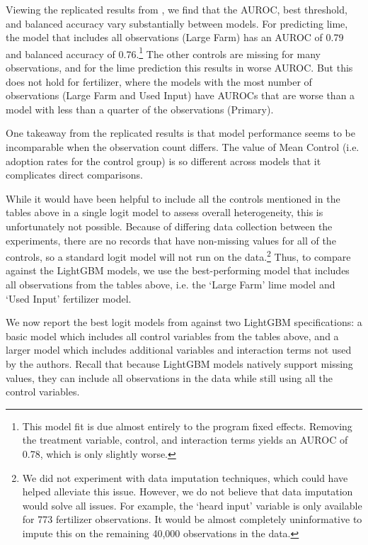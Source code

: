 \documentclass[12pt]{article}
\begin{document}



Viewing the replicated results from \textcite{fabregas_digital_2025}, we find that the AUROC, best threshold, and balanced accuracy vary substantially between models. For predicting lime, the model that includes all observations (Large Farm) has an AUROC of 0.79 and balanced accuracy of 0.76.\footnote{This model fit is due almost entirely to the program fixed effects. Removing the treatment variable, control, and interaction terms yields an AUROC of 0.78, which is only slightly worse.} The other controls are missing for many observations, and for the lime prediction this results in worse AUROC. But this does not hold for fertilizer, where the models with the most number of observations (Large Farm and Used Input) have AUROCs that are worse than a model with less than a quarter of the observations (Primary).

One takeaway from the replicated results is that model performance seems to be incomparable when the observation count differs. The value of Mean Control (i.e. adoption rates for the control group) is so different across models that it complicates direct comparisons.

While it would have been helpful to include all the controls mentioned in the tables above in a single logit model to assess overall heterogeneity, this is unfortunately not possible. Because of differing data collection between the experiments, there are no records that have non-missing values for all of the controls, so a standard logit model will not run on the data.\footnote{We did not experiment with data imputation techniques, which could have helped alleviate this issue. However, we do not believe that data imputation would solve all issues. For example, the `heard input' variable is only available for 773 fertilizer observations. It would be almost completely uninformative to impute this on the remaining 40,000 observations in the data.} Thus, to compare against the LightGBM models, we use the best-performing model that includes all observations from the tables above, i.e. the `Large Farm' lime model and `Used Input' fertilizer model.

We now report the best logit models from \textcite{fabregas_digital_2025} against two LightGBM specifications: a basic model which includes all control variables from the tables above, and a larger model which includes additional variables and interaction terms not used by the authors. Recall that because LightGBM models natively support missing values, they can include all observations in the data while still using all the control variables.
\end{document}
